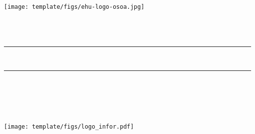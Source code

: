 \thispagestyle{empty}

\newcommand{\HRule}{\rule{\linewidth}{0.5mm}} 

\begin{center}
  \texttt{[image: template/figs/ehu-logo-osoa.jpg]} \\[1.3cm]
   {\Large \masterName}\\
   {\masterSpecialization}\\[1.5cm]

  {\large {\mapizenburua}}\\[0.2cm]
\HRule \\[0.5cm]

{ \LARGE 
\begin{spacing}{1}
  \textbf{\izenburua}
\end{spacing}
}
 \vspace{0.5cm}
\HRule \\[1.0cm]

{ \authorLabel\\}
{\Large \textsl{\egilea}\\}
\vspace{0.5 cm}
{ \directorLabel\\}
{\Large \textsl{\director}}
\vspace{1 cm}

\texttt{[image: template/figs/logo\_infor.pdf]} \\[0.1cm]
{\large \textsf{\masterDate}}

\end{center}

